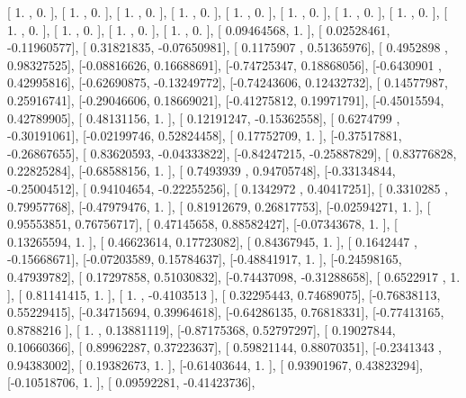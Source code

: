 \documentclass{article}
\begin{document}
       [ 1.        ,  0.        ],
       [ 1.        ,  0.        ],
       [ 1.        ,  0.        ],
       [ 1.        ,  0.        ],
       [ 1.        ,  0.        ],
       [ 1.        ,  0.        ],
       [ 1.        ,  0.        ],
       [ 1.        ,  0.        ],
       [ 1.        ,  0.        ],
       [ 1.        ,  0.        ],
       [ 1.        ,  0.        ],
       [ 1.        ,  0.        ],
       [ 0.09464568,  1.        ],
       [ 0.02528461, -0.11960577],
       [ 0.31821835, -0.07650981],
       [ 0.1175907 ,  0.51365976],
       [ 0.4952898 ,  0.98327525],
       [-0.08816626,  0.16688691],
       [-0.74725347,  0.18868056],
       [-0.6430901 ,  0.42995816],
       [-0.62690875, -0.13249772],
       [-0.74243606,  0.12432732],
       [ 0.14577987,  0.25916741],
       [-0.29046606,  0.18669021],
       [-0.41275812,  0.19971791],
       [-0.45015594,  0.42789905],
       [ 0.48131156,  1.        ],
       [ 0.12191247, -0.15362558],
       [ 0.6274799 , -0.30191061],
       [-0.02199746,  0.52824458],
       [ 0.17752709,  1.        ],
       [-0.37517881, -0.26867655],
       [ 0.83620593, -0.04333822],
       [-0.84247215, -0.25887829],
       [ 0.83776828,  0.22825284],
       [-0.68588156,  1.        ],
       [ 0.7493939 ,  0.94705748],
       [-0.33134844, -0.25004512],
       [ 0.94104654, -0.22255256],
       [ 0.1342972 ,  0.40417251],
       [ 0.3310285 ,  0.79957768],
       [-0.47979476,  1.        ],
       [ 0.81912679,  0.26817753],
       [-0.02594271,  1.        ],
       [ 0.95553851,  0.76756717],
       [ 0.47145658,  0.88582427],
       [-0.07343678,  1.        ],
       [ 0.13265594,  1.        ],
       [ 0.46623614,  0.17723082],
       [ 0.84367945,  1.        ],
       [ 0.1642447 , -0.15668671],
       [-0.07203589,  0.15784637],
       [-0.48841917,  1.        ],
       [-0.24598165,  0.47939782],
       [ 0.17297858,  0.51030832],
       [-0.74437098, -0.31288658],
       [ 0.6522917 ,  1.        ],
       [ 0.81141415,  1.        ],
       [ 1.        , -0.4103513 ],
       [ 0.32295443,  0.74689075],
       [-0.76838113,  0.55229415],
       [-0.34715694,  0.39964618],
       [-0.64286135,  0.76818331],
       [-0.77413165,  0.8788216 ],
       [ 1.        ,  0.13881119],
       [-0.87175368,  0.52797297],
       [ 0.19027844,  0.10660366],
       [ 0.89962287,  0.37223637],
       [ 0.59821144,  0.88070351],
       [-0.2341343 ,  0.94383002],
       [ 0.19382673,  1.        ],
       [-0.61403644,  1.        ],
       [ 0.93901967,  0.43823294],
       [-0.10518706,  1.        ],
       [ 0.09592281, -0.41423736],
\end{document}
